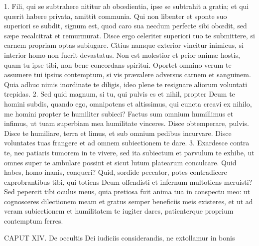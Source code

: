 \documentclass[twoside]{article}
\begin{document}
1. Fili, qui se subtrahere nititur ab obœdientia, ipse se subtrahit a gratia; et qui quærit habere privata, amittit communia. Qui non libenter et sponte suo superiori se subdit, signum est, quod caro sua necdum perfecte sibi obœdit, sed sæpe recalcitrat et remurmurat. Disce ergo celeriter superiori tuo te submittere, si carnem propriam optas subiugare. Citius namque exterior vincitur inimicus, si interior homo non fuerit devastatus. Non est molestior et peior animæ hostis, quam tu ipse tibi, non bene concordans spiritui. Oportet omnino verum te assumere tui ipsius contemptum, si vis prævalere adversus carnem et sanguinem. Quia adhuc nimis inordinate te diligis, ideo plene te resignare aliorum voluntati trepidas.
2. Sed quid magnum, si tu, qui pulvis es et nihil, propter Deum te homini subdis, quando ego, omnipotens et altissimus, qui cuncta creavi ex nihilo, me homini propter te humiliter subieci? Factus sum omnium humillimus et infimus, ut tuam superbiam mea humilitate vinceres. Disce obtemperare, pulvis. Disce te humiliare, terra et limus, et sub omnium pedibus incurvare. Disce voluntates tuas frangere et ad omnem subiectionem te dare.
3. Exardesce contra te, nec patiaris tumorem in te vivere, sed ita subiectum et parvulum te exhibe, ut omnes super te ambulare possint et sicut lutum platearum conculcare. Quid habes, homo inanis, conqueri? Quid, sordide peccator, potes contradicere exprobrantibus tibi, qui totiens Deum offendisti et infernum multotiens meruisti? Sed pepercit tibi oculus meus, quia pretiosa fuit anima tua in conspectu meo: ut cognosceres dilectionem meam et gratus semper beneficiis meis existeres, et ut ad veram subiectionem et humilitatem te iugiter dares, patienterque proprium contemptum ferres.


CAPUT XIV.
De occultis Dei iudiciis considerandis, ne extollamur in bonis
\end{document}
